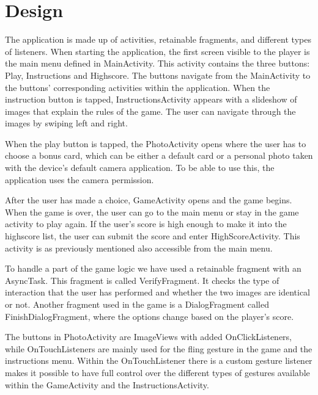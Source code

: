 \section{Design}
The application is made up of activities, retainable fragments, and different types of listeners. When starting the application, the first screen visible to the player is the main menu defined in MainActivity. This activity contains the three buttons: Play, Instructions and Highscore. The buttons navigate from the MainActivity to the buttons’ corresponding activities within the application. When the instruction button is tapped, InstructionsActivity appears with a slideshow of images that explain the rules of the game. The user can navigate through the images by swiping left and right.  \newline

When the play button is tapped, the PhotoActivity opens where the user has to choose a bonus card, which can be either a default card or a personal photo taken with the device’s default camera application. To be able to use this, the application uses the camera permission. \newline

After the user has made a choice, GameActivity opens and the game begins. When the game is over, the user can go to the main menu or stay in the game activity to play again. If the user’s score is high enough to make it into the highscore list, the user can submit the score and enter HighScoreActivity. This activity is as previously mentioned also accessible from the main menu. \newline

To handle a part of the game logic we have used a retainable fragment with an AsyncTask. This fragment is called VerifyFragment. It checks the type of interaction that the user has performed and whether the two images are identical or not. Another fragment used in the game is a DialogFragment called FinishDialogFragment, where the options change based on the player’s score. \newline

The buttons in PhotoActivity are ImageViews with added OnClickListeners, while OnTouchListeners are mainly used for the fling gesture in the game and the instructions menu. Within the OnTouchListener there is a custom gesture listener makes it possible to have full control over the different types of gestures available within the GameActivity and the InstructionsActivity.
